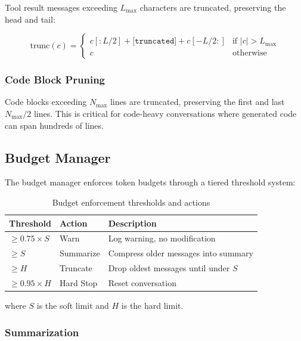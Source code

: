 Tool result messages exceeding $L_{\max}$ characters are truncated, preserving the head and tail:

\begin{equation}
    \text{trunc}(c) = \begin{cases}
        c[:L/2] + \texttt{[truncated]} + c[-L/2:] & \text{if } |c| > L_{\max} \\
        c & \text{otherwise}
    \end{cases}
\end{equation}

\subsubsection{Code Block Pruning}

Code blocks exceeding $N_{\max}$ lines are truncated, preserving the first and last $N_{\max}/2$ lines. This is critical for code-heavy conversations where generated code can span hundreds of lines.

\subsection{Budget Manager}

The budget manager enforces token budgets through a tiered threshold system:

\begin{table}[H]
\centering
\caption{Budget enforcement thresholds and actions}
\label{tab:budget}
\begin{tabular}{@{}lll@{}}
\toprule
\textbf{Threshold} & \textbf{Action} & \textbf{Description} \\
\midrule
$\geq 0.75 \times S$ & Warn & Log warning, no modification \\
$\geq S$ & Summarize & Compress older messages into summary \\
$\geq H$ & Truncate & Drop oldest messages until under $S$ \\
$\geq 0.95 \times H$ & Hard Stop & Reset conversation \\
\bottomrule
\end{tabular}
\end{table}

where $S$ is the soft limit and $H$ is the hard limit.

\subsubsection{Summarization}

